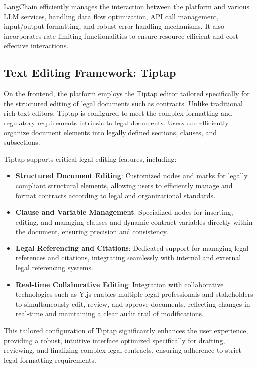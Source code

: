 LangChain efficiently manages the interaction between the platform and various LLM services, handling data flow optimization, API call management, input/output formatting, and robust error handling mechanisms. It also incorporates rate-limiting functionalities to ensure resource-efficient and cost-effective interactions.


\subsection{Text Editing Framework: Tiptap}
On the frontend, the platform employs the Tiptap editor tailored specifically for the structured editing of legal documents such as contracts. Unlike traditional rich-text editors, Tiptap is configured to meet the complex formatting and regulatory requirements intrinsic to legal documents. Users can efficiently organize document elements into legally defined sections, clauses, and subsections.\mynewline

Tiptap supports critical legal editing features, including:

\begin{itemize}
    \item \textbf{Structured Document Editing}: Customized nodes and marks for legally compliant structural elements, allowing users to efficiently manage and format contracts according to legal and organizational standards.
    \item \textbf{Clause and Variable Management}: Specialized nodes for inserting, editing, and managing clauses and dynamic contract variables directly within the document, ensuring precision and consistency.
    \item \textbf{Legal Referencing and Citations}: Dedicated support for managing legal references and citations, integrating seamlessly with internal and external legal referencing systems.
    \item \textbf{Real-time Collaborative Editing}: Integration with collaborative technologies such as Y.js enables multiple legal professionals and stakeholders to simultaneously edit, review, and approve documents, reflecting changes in real-time and maintaining a clear audit trail of modifications.
\end{itemize}

This tailored configuration of Tiptap significantly enhances the user experience, providing a robust, intuitive interface optimized specifically for drafting, reviewing, and finalizing complex legal contracts, ensuring adherence to strict legal formatting requirements.

